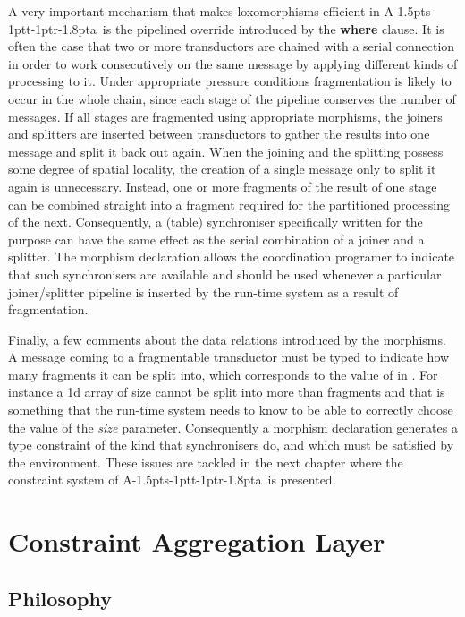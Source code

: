 \documentclass[11pt]{report}
\def\ak{{\textsf{A\kern-1.5pts\kern-1ptt\kern-1ptr\kern-1.8pta}}\kern-2pt{\it K\kern-2ptahn}}
\begin{document}
A very important mechanism that makes loxomorphisms efficient in \ak\ is the pipelined override introduced by the {\bf where} clause. It is often the case
that two or more transductors are chained with a serial connection in order to work consecutively on the same message by applying different kinds of processing to it.
Under appropriate pressure conditions fragmentation is likely to occur in the whole chain, since each stage of the pipeline conserves the number of messages. 
If all stages are fragmented using appropriate morphisms, the joiners and splitters are inserted between transductors to gather the results into one message and split it back out again. When the joining and the splitting possess some degree of spatial locality, the creation of a single message only to split it again is unnecessary. Instead, one or more fragments of the result of one stage can be combined straight into a fragment required for the partitioned processing of the next. Consequently, a  (table) synchroniser specifically written for the purpose can have the same effect as the serial combination of a joiner and a splitter. The morphism declaration allows the
coordination programer to indicate that such synchronisers are available and should be used whenever a particular joiner/splitter pipeline is inserted by the
run-time system as a result of fragmentation.         

Finally, a few comments about the data relations introduced by the morphisms. A message coming to a fragmentable transductor must be typed to indicate 
how many fragments it can be split into, which corresponds to the value of  in . 
For instance a 1d array of size  cannot be split into more than  fragments and that is something that the run-time
system needs to know to be able to correctly choose the value of the {\em size} parameter. Consequently a morphism declaration generates a type constraint
of the kind that synchronisers do, and which must be satisfied by the environment. These issues are tackled in the next chapter where the constraint system 
of \ak\ is presented.



\chapter{Constraint Aggregation Layer}

\section{Philosophy}
\end{document}
